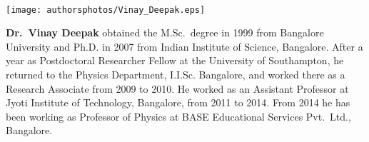 \noindent
\begin{minipage}[t]{3cm}%
\phantom{i}\\[-2.8cm]%
\texttt{[image: authorsphotos/Vinay\_Deepak.eps]}
\end{minipage}\quad
\begin{minipage}{6.5cm}
\textbf{Dr.\ Vinay Deepak} obtained the M.Sc.\ degree in 1999 from Bangalore University and Ph.D. in 2007 from Indian Institute of Science, Bangalore. After a year as Postdoctoral Researcher Fellow at the University of Southampton, he returned to the Physics Department, I.I.Sc. Bangalore, and worked there as a Research Associate from 2009 to 2010. He worked as an Assistant Professor at Jyoti Institute of Technology, Bangalore, from 2011 to 2014. From 2014 he has been working as Professor of Physics at BASE Educational Services Pvt.\ Ltd., Bangalore.
\end{minipage}

